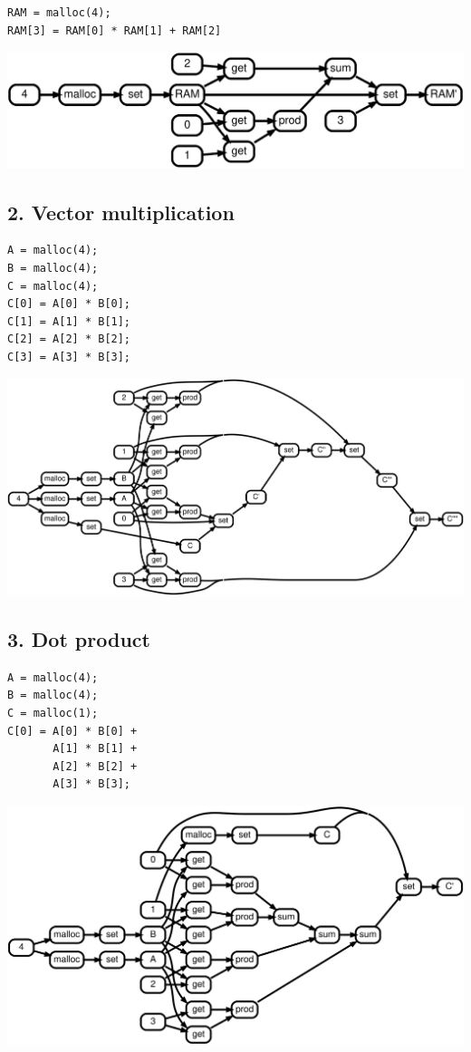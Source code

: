\documentclass[sigplan,10pt,review,anonymous]{acmart}
\begin{document}
\begin{lstlisting}
RAM = malloc(4);
RAM[3] = RAM[0] * RAM[1] + RAM[2]
\end{lstlisting}

\includegraphics[scale=0.1]{rtd31}

\subsection*{2. Vector multiplication}

\begin{lstlisting}
A = malloc(4);
B = malloc(4);
C = malloc(4);
C[0] = A[0] * B[0];
C[1] = A[1] * B[1];
C[2] = A[2] * B[2];
C[3] = A[3] * B[3];
\end{lstlisting}

\includegraphics[scale=0.1]{rtd32}

\subsection*{3. Dot product}

\begin{lstlisting}
A = malloc(4);
B = malloc(4);
C = malloc(1);
C[0] = A[0] * B[0] +
       A[1] * B[1] +
       A[2] * B[2] +
       A[3] * B[3];
\end{lstlisting}

\includegraphics[scale=0.1]{rtd33}
\end{document}
